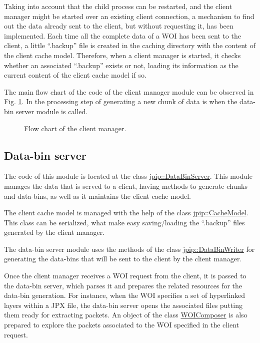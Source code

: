 Taking into account that the child process can be restarted, and the client
manager might be started over an existing client connection, a mechanism to
find out the data already sent to the client, but without requesting it,
has been implemented. Each time all the complete data of a WOI has been
sent to the client, a little ``.backup'' file is created in the caching
directory with the content of the client cache model. Therefore, when
a client manager is started, it checks whether an associated ``.backup''
exists or not, loading its information as the current content of the
client cache model if so.

The main flow chart of the code of the client manager module can be observed in
Fig. \ref{fig:client_manager}. In the processing step of generating a new
chunk of data is when the data-bin server module is called. 

\begin{figure}
\centering
\resizebox{0.9\textwidth}{!}{

}
\caption{Flow chart of the client manager.}
\label{fig:client_manager}
\end{figure}


\subsection{Data-bin server}

The code of this module is located at the class \hyperlink{classjpip_1_1DataBinServer}
{jpip::DataBinServer}. This module manages the data that is served to a client, having
methods to generate chunks and data-bins, as well as it maintains the client cache
model.

The client cache model is managed with the help of the class 
\hyperlink{classjpip_1_1CacheModel}{jpip::CacheModel}. This class can be serialized,
what make easy saving/loading the ``.backup'' files generated by the client manager.

The data-bin server module uses the methods of the class 
\hyperlink{classjpip_1_1DataBinWriter}{jpip::DataBinWriter} for generating the
data-bins that will be sent to the client by the client manager.

Once the client manager receives a WOI request from the client, it is passed to
the data-bin server, which parses it and prepares the related resources for
the data-bin generation. For
instance, when the WOI specifies a set of hyperlinked layers within a JPX file, 
the data-bin server opens the associated files putting them ready for
extracting packets. An object of the class \hyperlink{classjpip_1_1WOIComposer}
{WOIComposer} is also prepared to explore the packets associated to the
WOI specified in the client request.

